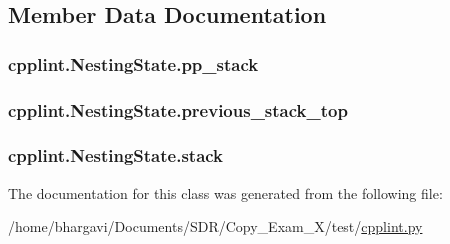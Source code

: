\subsection{Member Data Documentation}
\subsubsection[{\texorpdfstring{pp\+\_\+stack}{pp_stack}}]{\setlength{\rightskip}{0pt plus 5cm}cpplint.\+Nesting\+State.\+pp\+\_\+stack}\hypertarget{classcpplint_1_1_nesting_state_a3a5ca37e3066d91830ea1faa8feae4e5}{}\label{classcpplint_1_1_nesting_state_a3a5ca37e3066d91830ea1faa8feae4e5}
\subsubsection[{\texorpdfstring{previous\+\_\+stack\+\_\+top}{previous_stack_top}}]{\setlength{\rightskip}{0pt plus 5cm}cpplint.\+Nesting\+State.\+previous\+\_\+stack\+\_\+top}\hypertarget{classcpplint_1_1_nesting_state_a7aa34c8fb8df73d76f702c7012c46911}{}\label{classcpplint_1_1_nesting_state_a7aa34c8fb8df73d76f702c7012c46911}
\subsubsection[{\texorpdfstring{stack}{stack}}]{\setlength{\rightskip}{0pt plus 5cm}cpplint.\+Nesting\+State.\+stack}\hypertarget{classcpplint_1_1_nesting_state_a6ae9bea040f988d152922788d0d73a15}{}\label{classcpplint_1_1_nesting_state_a6ae9bea040f988d152922788d0d73a15}


The documentation for this class was generated from the following file\+:\begin{DoxyCompactItemize}
\item 
/home/bhargavi/\+Documents/\+S\+D\+R/\+Copy\+\_\+\+Exam\+\_\+X/test/\hyperlink{cpplint_8py}{cpplint.\+py}\end{DoxyCompactItemize}
